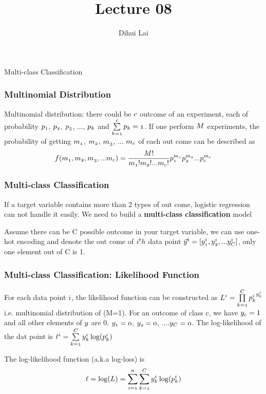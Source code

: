 \documentclass[notheorems, aspectratio=54]{beamer}
\title{Lecture 08}
\author{Dihui Lai}
\institute[WUSTL]{dlai@wustl.edu}
\begin{document}
\begin{frame}
    \titlepage
\end{frame}


\begin{frame}
\begin{center}
Multi-class Classification
\end{center}
\end{frame}

\begin{frame}
\frametitle{Multinomial Distribution }
Multinomial distribution: there could be $\mathnormal{c}$ outcome of an experiment, each of probability  $\mathnormal{p_1}$, $\mathnormal{p_2}$, $\mathnormal{p_3}$, ..., $\mathnormal{p_k}$ and $\mathnormal{\sum\limits_{k=1}^c p_k=1}$. If one perform $\mathnormal{M}$ experiments, the probability of getting $\mathnormal{m_1}$, $\mathnormal{m_2}$, $\mathnormal{m_3}$, ... $\mathnormal{m_c}$ of each out come can be described as 
$$\mathnormal{f(m_1, m_2, m_3, ... m_c)=\frac{M!}{m_1! m_2! ... m_c!} p_1^{m_1} p_2^{m_2} ... p_c^{m_c}}$$
\end{frame}


\begin{frame}
\frametitle{Multi-class Classification}
If a target variable contains more than 2 types of out come, logistic regression can not handle it easily. We need to build a \textbf{multi-class classification} model 

Assume there can be C possible outcome in your target variable, we can use one-hot encoding and denote the out come of $\mathnormal{i^th}$ data point $\mathnormal{\vec{y}^i=[y_1^i, y_2^i, ... y_C^i]}$, only one element out of C is 1.
\end{frame}

\begin{frame}

\frametitle{Multi-class Classification: Likelihood Function}
For each data point $\mathnormal{i}$, the likelihood function can be constructed as 
$\mathnormal{L^i=\prod \limits_{k=1}^C {p^{i}_{k}}^{y^i_k}}$ i.e. multinomial distribution of (M=1). For an outcome of class c, we have $\mathnormal{y_c}=1$ and all other elements of $\mathnormal{y}$ are 0. $\mathnormal{y_1=0}$, $\mathnormal{y_2=0}$, ....$\mathnormal{y_C=0}$. The log-likelihood of the dat point is $\mathnormal{ \ell^i=\sum\limits_{k=1}^C y^i_k \log(p^i_k)}$

The log-likelihood function (a.k.a log-loss) is
$$\mathnormal{\ell=\log(L)=\sum\limits_{i=1}^n \sum\limits_{k=1}^C y_k^i \log(p^i_k)}$$
\end{frame}
\end{document}
